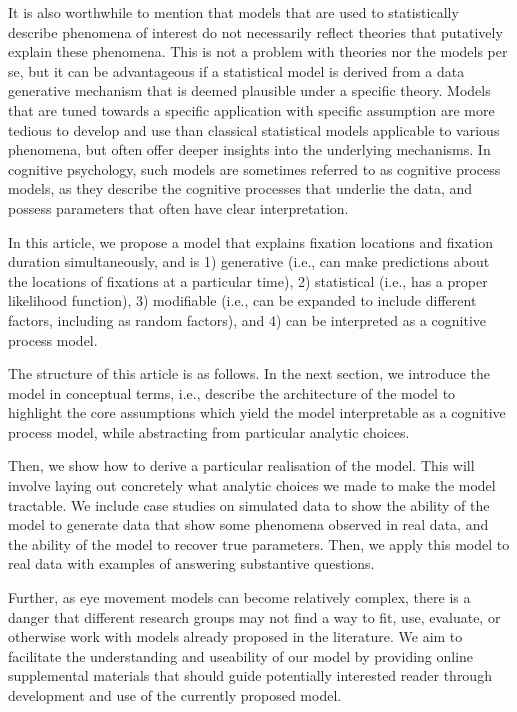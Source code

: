 \documentclass{article}
\begin{document}
It is also worthwhile to mention that models that are used to statistically describe phenomena of interest do not necessarily reflect theories that putatively explain these phenomena. This is not a problem with theories nor the models per se, but it can be advantageous if a statistical model is derived from a data generative mechanism that is deemed plausible under a specific theory. Models that are tuned towards a specific application with specific assumption are more tedious to develop and use than classical statistical models applicable to various phenomena, but often offer deeper insights into the underlying mechanisms. In cognitive psychology, such models are sometimes referred to as cognitive process models, as they describe the cognitive processes that underlie the data, and possess parameters that often have clear interpretation.

In this article, we propose a model that explains fixation locations and fixation duration simultaneously, and is 1) generative (i.e., can make predictions about the locations of fixations at a particular time), 2) statistical (i.e., has a proper likelihood function), 3) modifiable (i.e., can be expanded to include different factors, including as random factors), and 4) can be interpreted as a cognitive process model. 

The structure of this article is as follows. In the next section, we introduce the model in conceptual terms, i.e., describe the architecture of the model to highlight the core assumptions which yield the model interpretable as a cognitive process model, while abstracting from particular analytic choices. 

Then, we show how to derive a particular realisation of the model. This will involve laying out concretely what analytic choices we made to make the model tractable. We include case studies on simulated data to show the ability of the model to generate data that show some phenomena observed in real data, and the ability of the model to recover true parameters. Then, we apply this model to real data with examples of answering substantive questions.

Further, as eye movement models can become relatively complex, there is a danger that different research groups may not find a way to fit, use, evaluate, or otherwise work with models already proposed in the literature. We aim to facilitate the understanding and useability of our model by providing online supplemental materials that should guide potentially interested reader through development and use of the currently proposed model.
\end{document}
